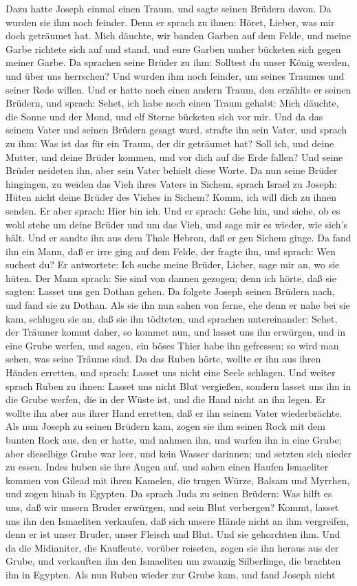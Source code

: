 Dazu hatte Joseph einmal einen Traum, und sagte seinen Brüdern davon. Da wurden sie ihm noch feinder. Denn er sprach zu ihnen: Höret, Lieber, was mir doch geträumet hat. Mich däuchte, wir banden Garben auf dem Felde, und meine Garbe richtete sich auf und stand, und eure Garben umher bücketen sich gegen meiner Garbe. Da sprachen seine Brüder zu ihm: Solltest du unser König werden, und über uns herrschen? Und wurden ihm noch feinder, um seines Traumes und seiner Rede willen. Und er hatte noch einen andern Traum, den erzählte er seinen Brüdern, und sprach: Sehet, ich habe noch einen Traum gehabt: Mich däuchte, die Sonne und der Mond, und elf Sterne bücketen sich vor mir. Und da das seinem Vater und seinen Brüdern gesagt ward, strafte ihn sein Vater, und sprach zu ihm: Was ist das für ein Traum, der dir geträumet hat? Soll ich, und deine Mutter, und deine Brüder kommen, und vor dich auf die Erde fallen? Und seine Brüder neideten ihn, aber sein Vater behielt diese Worte. Da nun seine Brüder hingingen, zu weiden das Vieh ihres Vaters in Sichem, sprach Israel zu Joseph: Hüten nicht deine Brüder des Viehes in Sichem? Komm, ich will dich zu ihnen senden. Er aber sprach: Hier bin ich. Und er sprach: Gehe hin, und siehe, ob es wohl stehe um deine Brüder und um das Vieh, und sage mir es wieder, wie sich’s hält. Und er sandte ihn aus dem Thale Hebron, daß er gen Sichem ginge. Da fand ihn ein Mann, daß er irre ging auf dem Felde, der fragte ihn, und sprach: Wen suchest du? Er antwortete: Ich suche meine Brüder, Lieber, sage mir an, wo sie hüten. Der Mann sprach: Sie sind von dannen gezogen; denn ich hörte, daß sie sagten: Lasset uns gen Dothan gehen. Da folgete Joseph seinen Brüdern nach, und fand sie zu Dothan. Als sie ihn nun sahen von ferne, ehe denn er nahe bei sie kam, schlugen sie an, daß sie ihn tödteten, und sprachen untereinander: Sehet, der Träumer kommt daher, so kommet nun, und lasset uns ihn erwürgen, und in eine Grube werfen, und sagen, ein böses Thier habe ihn gefressen; so wird man sehen, was seine Träume sind. Da das Ruben hörte, wollte er ihn aus ihren Händen erretten, und sprach: Lasset uns nicht eine Seele schlagen. Und weiter sprach Ruben zu ihnen: Lasset uns nicht Blut vergießen, sondern lasset uns ihn in die Grube werfen, die in der Wüste ist, und die Hand nicht an ihn legen. Er wollte ihn aber aus ihrer Hand erretten, daß er ihn seinem Vater wiederbrächte. Als nun Joseph zu seinen Brüdern kam, zogen sie ihm seinen Rock mit dem bunten Rock aus, den er hatte, und nahmen ihn, und warfen ihn in eine Grube; aber dieselbige Grube war leer, und kein Wasser darinnen; und setzten sich nieder zu essen. Indes huben sie ihre Augen auf, und sahen einen Haufen Ismaeliter kommen von Gilead mit ihren Kamelen, die trugen Würze, Balsam und Myrrhen, und zogen hinab in Egypten. Da sprach Juda zu seinen Brüdern: Was hilft es uns, daß wir unsern Bruder erwürgen, und sein Blut verbergen? Kommt, lasset uns ihn den Ismaeliten verkaufen, daß sich unsere Hände nicht an ihm vergreifen, denn er ist unser Bruder, unser Fleisch und Blut. Und sie gehorchten ihm. Und da die Midianiter, die Kaufleute, vorüber reiseten, zogen sie ihn heraus aus der Grube, und verkauften ihn den Ismaeliten um zwanzig Silberlinge, die brachten ihn in Egypten. Als nun Ruben wieder zur Grube kam, und fand Joseph nicht 